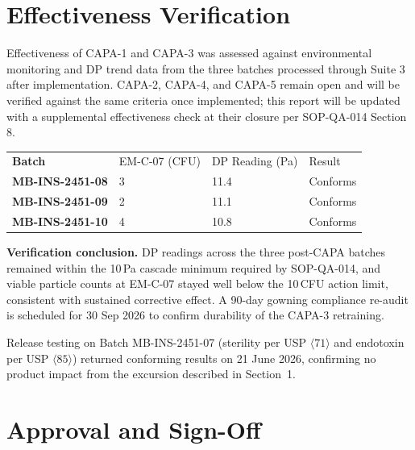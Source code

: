 
\section{Effectiveness Verification}

Effectiveness of CAPA-1 and CAPA-3 was assessed against environmental monitoring and
DP trend data from the three batches processed through Suite 3 after implementation.
CAPA-2, CAPA-4, and CAPA-5 remain open and will be verified against the same criteria
once implemented; this report will be updated with a supplemental effectiveness check
at their closure per SOP-QA-014 Section 8.

\begin{center}
\begin{tabularx}{\linewidth}{@{}>{\bfseries}l X X X@{}}
\rowcolor{meridiannavy}
{\color{white}Batch} & {\color{white}EM-C-07 (CFU)} & {\color{white}DP Reading (Pa)} &
{\color{white}Result} \\
MB-INS-2451-08 & 3 & 11.4 & Conforms \\
\rowcolor{meridianpaper}
MB-INS-2451-09 & 2 & 11.1 & Conforms \\
MB-INS-2451-10 & 4 & 10.8 & Conforms \\
\end{tabularx}
\end{center}

\begin{tcolorbox}[infobox]
\textbf{Verification conclusion.} DP readings across the three post-CAPA batches
remained within the 10\,Pa cascade minimum required by SOP-QA-014, and viable particle
counts at EM-C-07 stayed well below the 10\,CFU action limit, consistent with sustained
corrective effect. A 90-day gowning compliance re-audit is scheduled for 30 Sep 2026 to
confirm durability of the CAPA-3 retraining.
\end{tcolorbox}

Release testing on Batch MB-INS-2451-07 (sterility per USP $\langle71\rangle$ and
endotoxin per USP $\langle85\rangle$) returned conforming results on 21 June 2026,
confirming no product impact from the excursion described in Section~1.

\section{Approval and Sign-Off}

